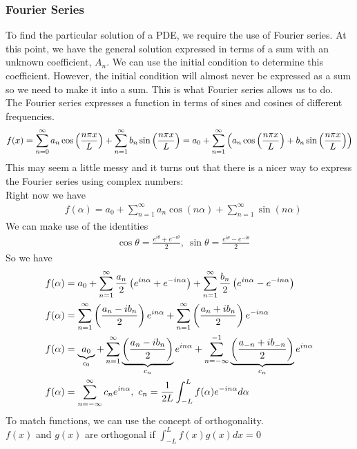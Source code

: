 \documentclass[11pt, fleqn]{article}
\begin{document}
\subsubsection{Fourier Series}
To find the particular solution of a PDE, we require the use of Fourier series. At this point, we have the general solution expressed in terms of a sum with an unknown coefficient, $A_n$. We can use the initial condition to determine this coefficient. However, the initial condition will almost never be expressed as a sum so we need to make it into a sum. This is what Fourier series allows us to do.\\
The Fourier series expresses a function in terms of sines and cosines of different frequencies.
$$f(x)=\sum_{n=0}^\infty a_n\cos\left( \frac{n\pi x}{L} \right)+\sum_{n=1}^\infty b_n\sin\left( \frac{n\pi x}{L} \right)=a_0+\sum_{n=1}^\infty\left( a_n\cos\left( \frac{n\pi x}{L} \right)+b_n\sin\left( \frac{n\pi x}{L} \right) \right)$$
This may seem a little messy and it turns out that there is a nicer way to express the Fourier series using complex numbers:\\
Right now we have
\begin{align*}
    &f(\alpha)=a_0+\sum_{n=1}^\infty a_n\cos(n\alpha)+\sum_{n=1}^\infty\sin(n\alpha)
\end{align*}
We can make use of the identities
\begin{align*}
    &\cos\theta=\frac{e^{i\theta}+e^{-i\theta}}{2},\ \sin\theta=\frac{e^{i\theta}-e^{-i\theta}}{2}
\end{align*}
So we have
\begin{align*}    
    &f(\alpha)=a_0+\sum_{n=1}^\infty\frac{a_n}{2}\brround{e^{in\alpha}+e^{-in\alpha}}+\sum_{n=1}^\infty\frac{b_n}{2}\brround{e^{in\alpha}-e^{-in\alpha}}\\
    &f(\alpha)=\sum_{n=1}^\infty\brround{\frac{a_n-ib_n}{2}}e^{in\alpha}+\sum_{n=1}^\infty\brround{\frac{a_n+ib_n}{2}}e^{-in\alpha}\\
    &f(\alpha)=\underbrace{a_0}_{c_0}+\sum_{n=1}^\infty\underbrace{\brround{\frac{a_n-ib_n}{2}}}_{c_n}e^{in\alpha}+\sum_{n=-\infty}^{-1}\underbrace{\brround{\frac{a_{-n}+ib_{-n}}{2}}}_{c_n}e^{in\alpha}\\
    &f(\alpha)=\sum_{n=-\infty}^\infty c_ne^{in\alpha},\ c_n=\frac{1}{2L}\int_{-L}^Lf(\alpha)e^{-in\alpha}d\alpha
\end{align*}
To match functions, we can use the concept of orthogonality.\\
$f(x)$ and $g(x)$ are orthogonal if $\displaystyle{\int_{-L}^Lf(x)g(x)dx=0}$\\
\end{document}
